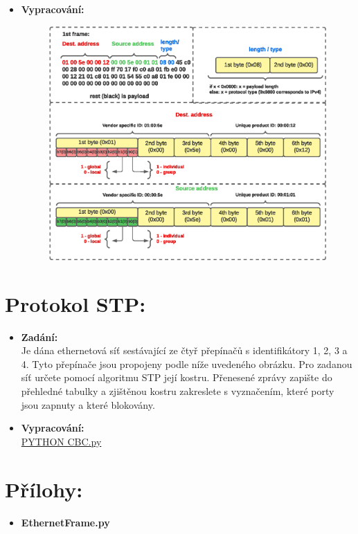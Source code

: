 \documentclass[10pt, a4paper]{article}%
\begin{document}
\begin{itemize}[label={}]
		\item \textbf{Vypracování:}\\
		\begin{figure}[ht!]
			\centering
			\includegraphics[width = 1\textwidth]{ethernet.eps}
		\end{figure}
		
	\end{itemize}

\section*{\large{\textbf{ Protokol STP:}}}
	\begin{itemize}[label={}]
		\item \textbf{Zadání:}\\
		Je dána ethernetová síť sestávající ze čtyř přepínačů s identifikátory 1, 2, 3 a 4. Tyto přepínače jsou 
		propojeny podle níže uvedeného obrázku. Pro zadanou síť určete pomocí algoritmu STP její kostru. 
		Přenesené zprávy zapište do přehledné tabulky a zjištěnou kostru zakreslete s vyznačením, které porty jsou zapnuty a které blokovány.


		\item \textbf{Vypracování:}\\
		\href{https://github.com/FilipPaul/ctvrtak_letni_semestr/blob/main/MKC_NSB/ukol1_kryptografie/README.md}{\color{blue} PYTHON CBC.py}
	\end{itemize}
\section*{\large{\textbf{Přílohy:}}}

\begin{itemize}[label={}]
	\item \textbf{EthernetFrame.py}\\
	
	\clearpage
\end{itemize}
\end{document}

